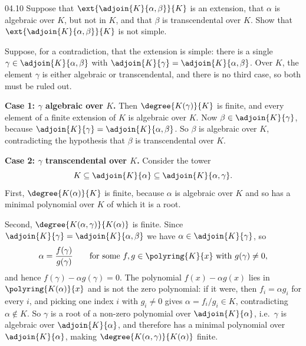 \documentclass[11pt]{article}
\begin{document}
\begin{problem}{04.10}
  Suppose that $\ext{\adjoin{K}{\alpha, \beta}}{K}$ is an extension, that
  $\alpha$ is algebraic over $K$, but not in $K$, and that $\beta$ is
  transcendental over $K$. Show that $\ext{\adjoin{K}{\alpha, \beta}}{K}$ is
  not simple.
\end{problem}
\begin{solution}
  Suppose, for a contradiction, that the extension is simple: there is a single
  $\gamma \in \adjoin{K}{\alpha,\beta}$ with
  $\adjoin{K}{\gamma} = \adjoin{K}{\alpha,\beta}$. Over $K$, the element
  $\gamma$ is either algebraic or transcendental, and there is no third case,
  so both must be ruled out.

  \medskip
  \textbf{Case 1: $\gamma$ algebraic over $K$.} Then $\degree{K(\gamma)}{K}$ is
  finite, and every element of a finite extension of $K$ is algebraic over $K$.
  Now $\beta \in \adjoin{K}{\gamma}$, because
  $\adjoin{K}{\gamma} = \adjoin{K}{\alpha,\beta}$. So $\beta$ is algebraic over
  $K$, contradicting the hypothesis that $\beta$ is transcendental over $K$.

  \medskip
  \textbf{Case 2: $\gamma$ transcendental over $K$.} Consider the tower
  \[
    K \subseteq \adjoin{K}{\alpha} \subseteq \adjoin{K}{\alpha,\gamma}.
  \]
  First, $\degree{K(\alpha)}{K}$ is finite, because $\alpha$ is algebraic over
  $K$ and so has a minimal polynomial over $K$ of which it is a root.

  Second, $\degree{K(\alpha,\gamma)}{K(\alpha)}$ is finite. Since
  $\adjoin{K}{\gamma} = \adjoin{K}{\alpha,\beta}$ we have
  $\alpha \in \adjoin{K}{\gamma}$, so
  \[
    \alpha = \frac{f(\gamma)}{g(\gamma)}
    \qquad\text{for some } f, g \in \polyring{K}{x} \text{ with } g(\gamma) \neq 0,
  \]
  and hence $f(\gamma) - \alpha g(\gamma) = 0$. The polynomial
  $f(x) - \alpha g(x)$ lies in $\polyring{K(\alpha)}{x}$ and is not the zero
  polynomial: if it were, then $f_i = \alpha g_i$ for every $i$, and picking one
  index $i$ with $g_i \neq 0$ gives $\alpha = f_i / g_i \in K$, contradicting
  $\alpha \notin K$. So $\gamma$ is a root of a non-zero polynomial over
  $\adjoin{K}{\alpha}$, i.e.\ $\gamma$ is algebraic over $\adjoin{K}{\alpha}$,
  and therefore has a minimal polynomial over $\adjoin{K}{\alpha}$, making
  $\degree{K(\alpha,\gamma)}{K(\alpha)}$ finite.


\end{solution}
\end{document}
